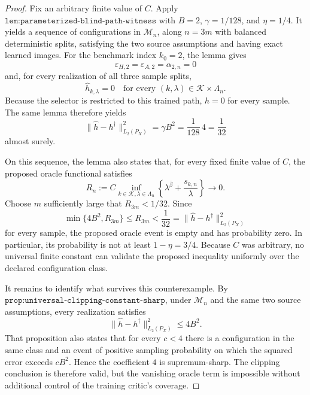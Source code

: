 \begin{proof}
Fix an arbitrary finite value of \(C\). Apply \(\texttt{lem:parameterized-blind-path-witness}\) with \(B=2\), \(\gamma=1/128\), and \(\eta=1/4\). It yields a sequence of configurations in \(\mathcal M_n\), along \(n=3m\) with balanced deterministic splits, satisfying the two source assumptions and having exact learned images. For the benchmark index \(k_0=2\), the lemma gives
\[
 \varepsilon_{H,2}=\varepsilon_{A,2}=\alpha_{2,n}=0
\]
and, for every realization of all three sample splits,
\[
 \widehat h_{k,\lambda}=0
 \quad\text{for every }(k,\lambda)\in\mathcal K\times\Lambda_n.
\]
Because the selector is restricted to this trained path, \(\widehat h=0\) for every sample. The same lemma therefore yields
\[
 \|\widehat h-h^\dagger\|_{L_2(P_X)}^2
 =\gamma B^2
 =\frac1{128}\,4
 =\frac1{32}
\]
almost surely.

On this sequence, the lemma also states that, for every fixed finite value of \(C\), the proposed oracle functional satisfies
\[
 R_n:=C\inf_{k\in\mathcal K,\lambda\in\Lambda_n}
 \left\{\lambda^{\bar\beta}+\frac{s_{k,n}}{\lambda}\right\}
 \longrightarrow0.
\]
Choose \(m\) sufficiently large that \(R_{3m}<1/32\). Since
\[
 \min\{4B^2,R_{3m}\}\le R_{3m}<\frac1{32}
 =\|\widehat h-h^\dagger\|_{L_2(P_X)}^2
\]
for every sample, the proposed oracle event is empty and has probability zero. In particular, its probability is not at least \(1-\eta=3/4\). Because \(C\) was arbitrary, no universal finite constant can validate the proposed inequality uniformly over the declared configuration class.

It remains to identify what survives this counterexample. By \(\texttt{prop:universal-clipping-constant-sharp}\), under \(\mathcal M_n\) and the same two source assumptions, every realization satisfies
\[
 \|\widehat h-h^\dagger\|_{L_2(P_X)}^2\le4B^2.
\]
That proposition also states that for every \(c<4\) there is a configuration in the same class and an event of positive sampling probability on which the squared error exceeds \(cB^2\). Hence the coefficient \(4\) is supremum-sharp. The clipping conclusion is therefore valid, but the vanishing oracle term is impossible without additional control of the training critic's coverage.
\end{proof}
